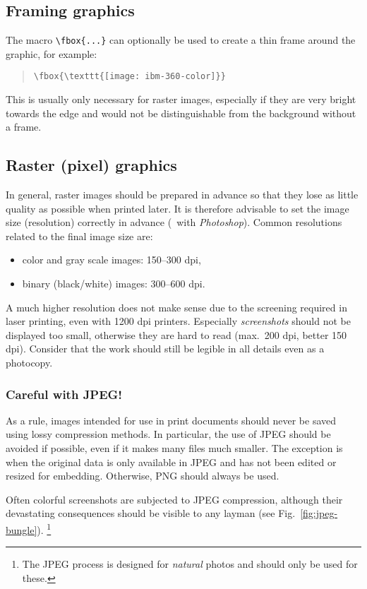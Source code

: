 \subsection{Framing graphics}

The macro \verb!\fbox{...}! can optionally be used to create a thin frame
around the graphic, for example:
%
\begin{quote}
    \verb!\fbox{\texttt{[image: ibm-360-color]}}!
\end{quote}
%
This is usually only necessary for raster images, especially if they are very
bright towards the edge and would not be distinguishable from the background
without a frame.

\subsection{Raster (pixel) graphics}

In general, raster images should be prepared in advance so that they lose as
little quality as possible when printed later. It is therefore advisable to
set the image size (resolution) correctly in advance (\eg\ with
\emph{Photoshop}). Common resolutions related to the final image size are:
%
\begin{itemize}
    \item color and gray scale images: 150--300 dpi,
    \item binary (black/white) images: 300--600 dpi.
\end{itemize}
%
A much higher resolution does not make sense due to the screening required in
laser printing, even with 1200 dpi printers. Especially \emph{screen\-shots}
should not be displayed too small, otherwise they are hard to read (max.\ 200
dpi, better 150 dpi). Consider that the work should still be legible in all
details even as a photocopy.

\subsubsection{Careful with JPEG!}

As a rule, images intended for use in print documents should never be saved
using lossy compression methods. In particular, the use of JPEG should be
avoided if possible, even if it makes many files much smaller. The exception
is when the original data is only available in JPEG and has not been edited
or resized for embedding. Otherwise, PNG should always be used.

Often colorful screenshots are subjected to JPEG compression, although their
devastating consequences should be visible to any layman (see
Fig.~\ref{fig:jpeg-bungle}).%
\footnote{The JPEG process is designed for \emph{natural} photos and should
only be used for these.}

